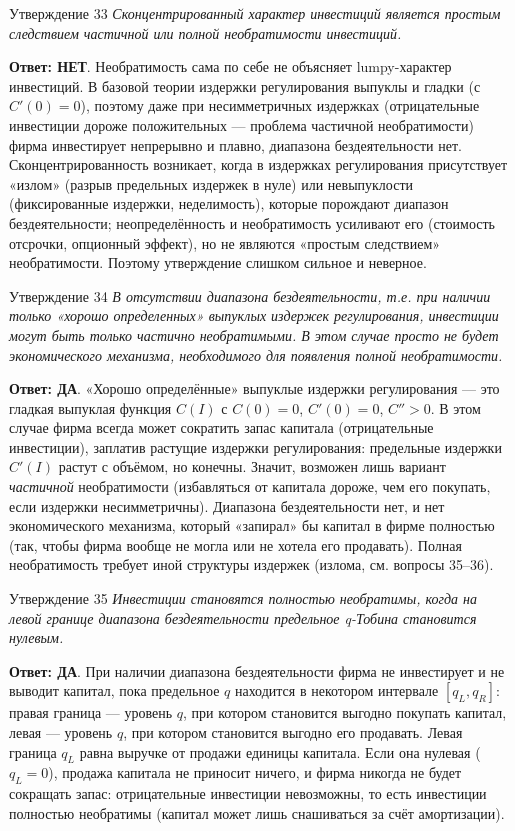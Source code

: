 \documentclass[10pt,a4paper]{article}
\newcommand{\qda}{\textbf{\color{yesgreen}Ответ: ДА}}
\newcommand{\qnet}{\textbf{\color{nored}Ответ: НЕТ}}
\newenvironment{answer}[2]{%
  \begin{qbox}{Утверждение #1}
  \textit{#2}\par\smallskip
}{%
  \end{qbox}\vspace{2pt}
}
\begin{document}
\begin{answer}{33}{Сконцентрированный характер инвестиций является простым следствием частичной или полной необратимости инвестиций.}
\qnet. Необратимость сама по себе не объясняет lumpy-характер инвестиций. В базовой теории издержки регулирования выпуклы и гладки (с $C'(0)=0$), поэтому даже при несимметричных издержках (отрицательные инвестиции дороже положительных --- проблема частичной необратимости) фирма инвестирует непрерывно и плавно, диапазона бездеятельности нет. Сконцентрированность возникает, когда в издержках регулирования присутствует «излом» (разрыв предельных издержек в нуле) или невыпуклости (фиксированные издержки, неделимость), которые порождают диапазон бездеятельности; неопределённость и необратимость усиливают его (стоимость отсрочки, опционный эффект), но не являются «простым следствием» необратимости. Поэтому утверждение слишком сильное и неверное.
\end{answer}

\begin{answer}{34}{В отсутствии диапазона бездеятельности, т.е. при наличии только «хорошо определенных» выпуклых издержек регулирования, инвестиции могут быть только частично необратимыми. В этом случае просто не будет экономического механизма, необходимого для появления полной необратимости.}
\qda. «Хорошо определённые» выпуклые издержки регулирования --- это гладкая выпуклая функция $C(I)$ с $C(0)=0$, $C'(0)=0$, $C''>0$. В этом случае фирма всегда может сократить запас капитала (отрицательные инвестиции), заплатив растущие издержки регулирования: предельные издержки $C'(I)$ растут с объёмом, но конечны. Значит, возможен лишь вариант \emph{частичной} необратимости (избавляться от капитала дороже, чем его покупать, если издержки несимметричны). Диапазона бездеятельности нет, и нет экономического механизма, который «запирал» бы капитал в фирме полностью (так, чтобы фирма вообще не могла или не хотела его продавать). Полная необратимость требует иной структуры издержек (излома, см. вопросы 35--36).
\end{answer}

\begin{answer}{35}{Инвестиции становятся полностью необратимы, когда на левой границе диапазона бездеятельности предельное q-Тобина становится нулевым.}
\qda. При наличии диапазона бездеятельности фирма не инвестирует и не выводит капитал, пока предельное $q$ находится в некотором интервале $[q_L,q_R]$: правая граница --- уровень $q$, при котором становится выгодно покупать капитал, левая --- уровень $q$, при котором становится выгодно его продавать. Левая граница $q_L$ равна выручке от продажи единицы капитала. Если она нулевая ($q_L=0$), продажа капитала не приносит ничего, и фирма никогда не будет сокращать запас: отрицательные инвестиции невозможны, то есть инвестиции полностью необратимы (капитал может лишь снашиваться за счёт амортизации).
\end{answer}
\end{document}
